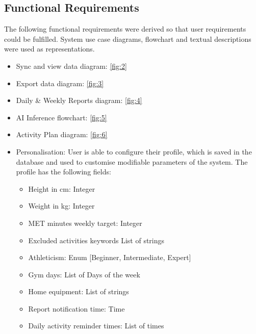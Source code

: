 \subsection{Functional Requirements}
The following functional requirements were derived so that user requirements could be fulfilled. System use case diagrams, flowchart and textual descriptions were used as representations.
\begin{itemize}
    \item Sync and view data diagram: \ref{fig:2}
    \item Export data diagram: \ref{fig:3}
    \item Daily \& Weekly Reports diagram: \ref{fig:4}
    \item AI Inference flowchart: \ref{fig:5}
    \item Activity Plan diagram: \ref{fig:6}
    \item Personalisation: User is able to configure their profile, which is saved in the database and used to customise modifiable parameters of the system. The profile has the following fields: 
    \begin{itemize}
        \item Height in cm: Integer
        \item Weight in kg: Integer
        \item MET minutes weekly target: Integer
        \item Excluded activities keywords List of strings
        \item Athleticism: Enum [Beginner, Intermediate, Expert]
        \item Gym days: List of Days of the week
        \item Home equipment: List of strings
        \item Report notification time: Time
        \item Daily activity reminder times: List of times
    \end{itemize}
\end{itemize}
